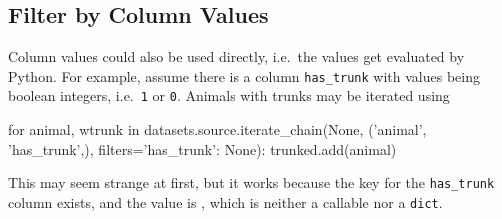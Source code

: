 \subsection*{Filter by Column Values}


Column values could also be used directly, i.e.\ the values get
evaluated by Python.  For example, assume there is a column
\texttt{has\_trunk} with values being boolean integers, i.e.\ \texttt{1}
or \texttt{0}.  Animals with trunks may be iterated using
\begin{python}
for animal, wtrunk in datasets.source.iterate_chain(None, ('animal', 'has_trunk',),
                                       filters={'has_trunk': None}):
    trunked.add(animal)
\end{python}
This may seem strange at first, but it works because the key for
the \texttt{has\_trunk} column exists, and the value is
\pyNone, which is neither a callable nor a \texttt{dict}.




